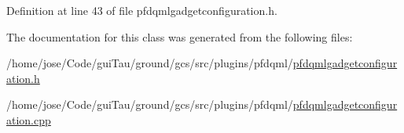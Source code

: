 Definition at line 43 of file pfdqmlgadgetconfiguration.\-h.



The documentation for this class was generated from the following files\-:\begin{DoxyCompactItemize}
\item 
/home/jose/\-Code/gui\-Tau/ground/gcs/src/plugins/pfdqml/\hyperlink{pfdqmlgadgetconfiguration_8h}{pfdqmlgadgetconfiguration.\-h}\item 
/home/jose/\-Code/gui\-Tau/ground/gcs/src/plugins/pfdqml/\hyperlink{pfdqmlgadgetconfiguration_8cpp}{pfdqmlgadgetconfiguration.\-cpp}\end{DoxyCompactItemize}
